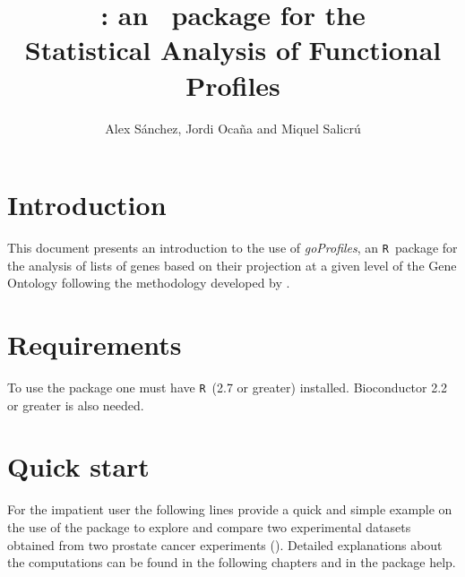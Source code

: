 \documentclass[a4paper]{article}
\title{\Rfunction{goProfiles}: an \R\, package for the\\ Statistical Analysis of Functional Profiles}
\author{Alex S\'anchez, Jordi Oca\~na and Miquel Salicr\'u}
\newcommand{\R}{\texttt{R}}
\newcommand{\Rpackage}[1]{{\textit{#1}}}
\begin{document}
\maketitle



\section{Introduction\label{chap:introduction}}

This document presents an introduction to the use of \Rpackage{goProfiles}, an \R\, package 
for the analysis of lists of genes based on their projection at a given level of the Gene Ontology following the methodology developed by 
\cite{Sanchez:2007a,Salicru:2011}.


\section{Requirements}

To use the package one must have \R\, (2.7 or greater) installed. 
Bioconductor 2.2 or greater is also needed.

\section{Quick start}

For the impatient user the following lines provide a quick and simple
example on the use of the package to explore and compare two
experimental datasets obtained from two prostate cancer experiments
(\cite{Welsh:2001,Singh:2002}). Detailed explanations about the
computations can be found in the following chapters and in the package
help.
\end{document}
